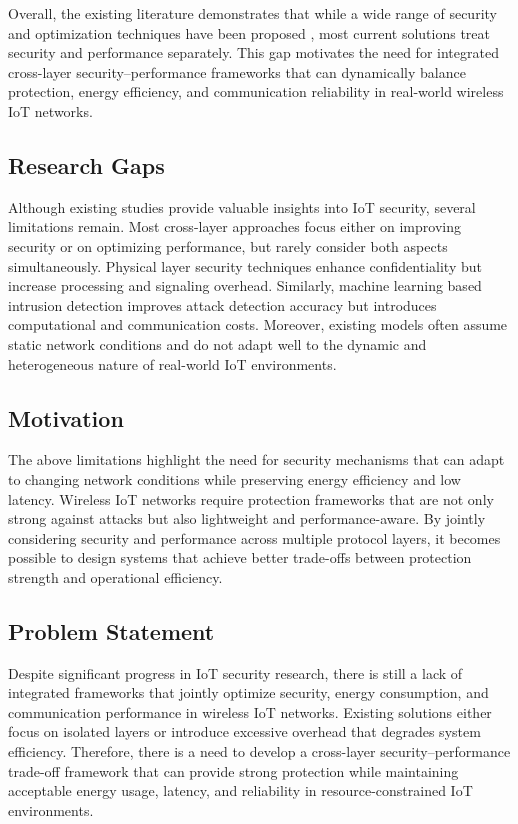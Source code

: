 \documentclass[a4paper,fleqn]{cas-dc}
\numberwithin{equation}{section}
\begin{document}
Overall, the existing literature demonstrates that while a wide range of security and optimization techniques have been proposed \cite{samson2024survey}, most current solutions treat security and performance separately. This gap motivates the need for integrated cross-layer security–performance frameworks that can dynamically balance protection, energy efficiency, and communication reliability in real-world wireless IoT networks.


\subsection{Research Gaps}

Although existing studies provide valuable insights into IoT security, several limitations remain. Most cross-layer approaches focus either on improving security or on optimizing performance, but rarely consider both aspects simultaneously. Physical layer security techniques enhance confidentiality but increase processing and signaling overhead. Similarly, machine learning based intrusion detection improves attack detection accuracy but introduces computational and communication costs. Moreover, existing models often assume static network conditions and do not adapt well to the dynamic and heterogeneous nature of real-world IoT environments.



\subsection{Motivation}

The above limitations highlight the need for security mechanisms that can adapt to changing network conditions while preserving energy efficiency and low latency. Wireless IoT networks require protection frameworks that are not only strong against attacks but also lightweight and performance-aware. By jointly considering security and performance across multiple protocol layers, it becomes possible to design systems that achieve better trade-offs between protection strength and operational efficiency.

\subsection{Problem Statement}

Despite significant progress in IoT security research, there is still a lack of integrated frameworks that jointly optimize security, energy consumption, and communication performance in wireless IoT networks. Existing solutions either focus on isolated layers or introduce excessive overhead that degrades system efficiency. Therefore, there is a need to develop a cross-layer security–performance trade-off framework that can provide strong protection while maintaining acceptable energy usage, latency, and reliability in resource-constrained IoT environments.
\end{document}
